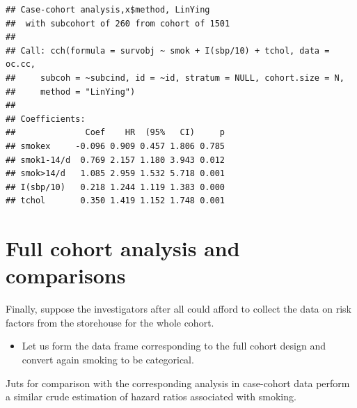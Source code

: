 \documentclass[
]{book}
\newenvironment{Shaded}{\begin{snugshade}}{\end{snugshade}}
\newcommand{\AttributeTok}[1]{\textcolor[rgb]{0.13,0.29,0.53}{#1}}
\newcommand{\FunctionTok}[1]{\textcolor[rgb]{0.13,0.29,0.53}{\textbf{#1}}}
\newcommand{\NormalTok}[1]{#1}
\newcommand{\OtherTok}[1]{\textcolor[rgb]{0.56,0.35,0.01}{#1}}
\newcommand{\SpecialCharTok}[1]{\textcolor[rgb]{0.81,0.36,0.00}{\textbf{#1}}}
\newcommand{\StringTok}[1]{\textcolor[rgb]{0.31,0.60,0.02}{#1}}
\providecommand{\tightlist}{%
  \setlength{\itemsep}{0pt}\setlength{\parskip}{0pt}}
\begin{document}
\begin{verbatim}
## Case-cohort analysis,x$method, LinYing 
##  with subcohort of 260 from cohort of 1501 
## 
## Call: cch(formula = survobj ~ smok + I(sbp/10) + tchol, data = oc.cc, 
##     subcoh = ~subcind, id = ~id, stratum = NULL, cohort.size = N, 
##     method = "LinYing")
## 
## Coefficients:
##              Coef    HR  (95%   CI)     p
## smokex     -0.096 0.909 0.457 1.806 0.785
## smok1-14/d  0.769 2.157 1.180 3.943 0.012
## smok>14/d   1.085 2.959 1.532 5.718 0.001
## I(sbp/10)   0.218 1.244 1.119 1.383 0.000
## tchol       0.350 1.419 1.152 1.748 0.001
\end{verbatim}

\section{Full cohort analysis and comparisons}\label{full-cohort-analysis-and-comparisons}

Finally, suppose the investigators after all could afford to collect the
data on risk factors from the storehouse for the whole cohort.

\begin{itemize}
\tightlist
\item
  Let us form the data frame corresponding to the full cohort design
  and convert again smoking to be categorical.
\end{itemize}

\begin{Shaded}
\end{Shaded}

Juts for comparison with the corresponding analysis in case-cohort data
perform a similar crude estimation of hazard ratios associated with smoking.
\end{document}
